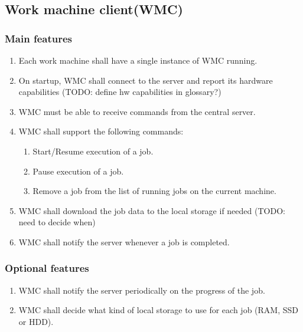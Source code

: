 \subsection{Work machine client(WMC)}
\subsubsection{Main features}
\begin{enumerate}
  \item Each work machine shall have a single instance of WMC running.
  \item On startup, WMC shall connect to the server and report its hardware capabilities (TODO: define hw capabilities in glossary?)
  \item WMC must be able to receive commands from the central server.
  \item WMC shall support the following commands:
  \begin{enumerate}
    \item Start/Resume execution of a job.
    \item Pause execution of a job.
    \item Remove a job from the list of running jobs on the current machine.
  \end{enumerate}
  \item WMC shall download the job data to the local storage if needed (TODO: need to decide when)
  \item WMC shall notify the server whenever a job is completed.
\end{enumerate}
\subsubsection{Optional features}
  \begin{enumerate}
    \item WMC shall notify the server periodically on the progress of the job.
    \item WMC shall decide what kind of local storage to use for each job (RAM, SSD or HDD).
  \end{enumerate}
